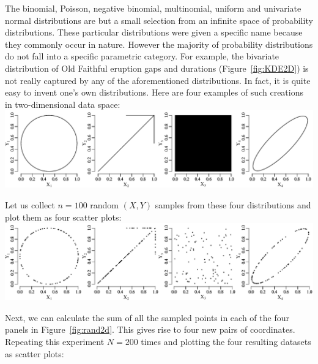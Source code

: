 The binomial, Poisson, negative binomial, multinomial, uniform and
univariate normal distributions are but a small selection from an
infinite space of probability distributions. These particular
distributions were given a specific name because they commonly occur
in nature.  However the majority of probability distributions do not
fall into a specific parametric category.  For example, the bivariate
distribution of Old Faithful eruption gaps and durations
(Figure~\ref{fig:KDE2D}) is not really captured by any of the
aforementioned distributions. In fact, it is quite easy to invent
one's own distributions. Here are four examples of such creations in
two-dimensional data space:\\

\noindent\includegraphics[width=\textwidth]{../figures/pop2d.pdf}
\begingroup {}
\label{fig:pop2d}
\endgroup

Let us collect $n=100$ random $(X,Y)$ samples from these four
distributions and plot them as four scatter plots:\\

\noindent\includegraphics[width=\textwidth]{../figures/rand2d.pdf}
\begingroup {}
\label{fig:rand2d}
\endgroup

Next, we can calculate the sum of all the sampled points in each of
the four panels in Figure~\ref{fig:rand2d}. This gives rise to four
new pairs of coordinates. Repeating this experiment $N=200$ times and
plotting the four resulting datasets as scatter plots:\\

